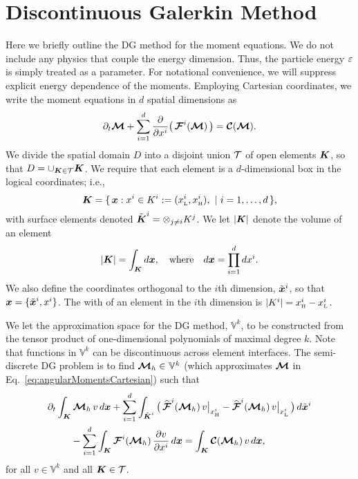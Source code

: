 \section{Discontinuous Galerkin Method}
\label{sec:dg}

Here we briefly outline the DG method for the moment equations.  
We do not include any physics that couple the energy dimension.  
Thus, the particle energy $\varepsilon$ is simply treated as a parameter.  
For notational convenience, we will suppress explicit energy dependence of the moments.  
Employing Cartesian coordinates, we write the moment equations in $d$ spatial dimensions as
\begin{equation}
  \partial_{t}{\boldsymbol{\mathcal{M}}}+\sum_{i=1}^{d}\frac{\partial }{\partial x^{i}}\big(\,\boldsymbol{\mathcal{F}}^{i}(\boldsymbol{\mathcal{M}})\,\big)=\boldsymbol{\mathcal{C}}(\boldsymbol{\mathcal{M}}).  
  \label{eq:angularMomentsCartesian}
\end{equation}
We divide the spatial domain $D$ into a disjoint union $\mathcal{T}$ of open elements $\boldsymbol{K}$, so that $D = \cup_{\boldsymbol{K} \in \mathcal{T}}\boldsymbol{K}$.  
We require that each element is a $d$-dimensional box in the logical coordinates; i.e.,
\begin{equation}
  \boldsymbol{K}=\{\,\boldsymbol{x} : x^{i} \in K^{i} := (x_{\mbox{\tiny L}}^{i},x_{\mbox{\tiny H}}^{i}),~|~i=1,\ldots,d\,\}, 
\end{equation}
with surface elements denoted $\tilde{\boldsymbol{K}}^{i}=\otimes_{j\ne i}K^{j}$.  
We let $|\boldsymbol{K}|$ denote the volume of an element
\begin{equation}
  |\boldsymbol{K}| = \int_{\boldsymbol{K}}d\boldsymbol{x}, \quad\text{where}\quad d\boldsymbol{x} = \prod_{i=1}^{d}dx^{i}.  
\end{equation}
We also define the coordinates orthogonal to the $i$th dimension, $\tilde{\boldsymbol{x}}^{i}$, so that $\boldsymbol{x}=\{\tilde{\boldsymbol{x}}^{i},x^{i}\}$.  
The with of an element in the $i$th dimension is $|K^{i}|=x_{\mbox{\tiny H}}^{i}-x_{\mbox{\tiny L}}^{i}$.  

We let the approximation space for the DG method, $\mathbb{V}^{k}$, to be constructed from the tensor product of one-dimensional polynomials of maximal degree $k$.  
Note that functions in $\mathbb{V}^{k}$ can be discontinuous across element interfaces.  
The semi-discrete DG problem is to find $\boldsymbol{\mathcal{M}}_{h}\in\mathbb{V}^{k}$ (which approximates $\boldsymbol{\mathcal{M}}$ in Eq.~\eqref{eq:angularMomentsCartesian}) such that
\begin{align}
  &\partial_{t}{}\int_{\boldsymbol{K}}\boldsymbol{\mathcal{M}}_{h}\,v\,d\boldsymbol{x}
  +\sum_{i=1}^{d}\int_{\tilde{\boldsymbol{K}}^{i}}
  \big(\,
    \widehat{\boldsymbol{\mathcal{F}}}^{i}(\boldsymbol{\mathcal{M}}_{h})\,v\big|_{x_{\mbox{\tiny H}}^{i}}
    -\widehat{\boldsymbol{\mathcal{F}}}^{i}(\boldsymbol{\mathcal{M}}_{h})\,v\big|_{x_{\mbox{\tiny L}}^{i}}
  \,\big)\,d\tilde{\boldsymbol{x}}^{i} \nonumber \\
  &\hspace{24pt}
  -\sum_{i=1}^{d}\int_{\boldsymbol{K}}\boldsymbol{\mathcal{F}}^{i}(\boldsymbol{\mathcal{M}}_{h})\,\frac{\partial v}{\partial x^{i}}\,d\boldsymbol{x}
  =\int_{\boldsymbol{K}}\boldsymbol{\mathcal{C}}(\boldsymbol{\mathcal{M}}_{h})\,v\,d\boldsymbol{x},
  \label{eq:semidiscreteDG}
\end{align}
for all $v\in\mathbb{V}^{k}$ and all $\boldsymbol{K}\in\mathcal{T}$.  

